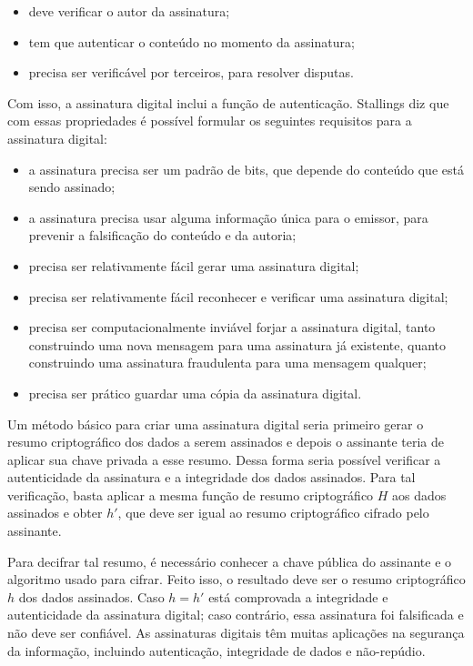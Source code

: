 \documentclass{article}
\begin{document}
\begin{itemize}
  \item deve verificar o autor da assinatura;
  \item tem que autenticar o conteúdo no momento da assinatura;
  \item precisa ser verificável por terceiros, para resolver disputas.
\end{itemize}

Com isso, a assinatura digital inclui a função de autenticação. Stallings diz
que com essas propriedades é possível formular os seguintes requisitos para a
assinatura digital:

\begin{itemize}
  \item a assinatura precisa ser um padrão de bits, que depende do conteúdo que
      está sendo assinado;
  \item a assinatura precisa usar alguma informação única para o emissor, para
      prevenir a falsificação do conteúdo e da autoria;
  \item precisa ser relativamente fácil gerar uma assinatura digital;
  \item precisa ser relativamente fácil reconhecer e verificar uma assinatura
      digital;
  \item precisa ser computacionalmente inviável forjar a assinatura digital,
      tanto construindo uma nova mensagem para uma assinatura já existente,
        quanto construindo uma assinatura fraudulenta para uma mensagem
        qualquer;
  \item precisa ser prático guardar uma cópia da assinatura digital.
\end{itemize}

Um método básico para criar uma assinatura digital seria primeiro gerar o
resumo criptográfico dos dados a serem assinados e depois o assinante teria de
aplicar sua chave privada a esse resumo. Dessa forma seria possível verificar a
autenticidade da assinatura e a integridade dos dados assinados. Para tal
verificação, basta aplicar a mesma função de resumo criptográfico $H$ aos dados
assinados e obter $h'$, que deve ser igual ao resumo criptográfico cifrado pelo
assinante.

Para decifrar tal resumo, é necessário conhecer a chave pública do assinante e
o algoritmo usado para cifrar. Feito isso, o resultado deve ser o resumo
criptográfico $h$ dos dados assinados. Caso $h = h'$ está comprovada a
integridade e autenticidade da assinatura digital; caso contrário, essa
assinatura foi falsificada e não deve ser confiável. As assinaturas digitais
têm muitas aplicações na segurança da informação, incluindo autenticação,
integridade de dados e não-repúdio.
\end{document}
